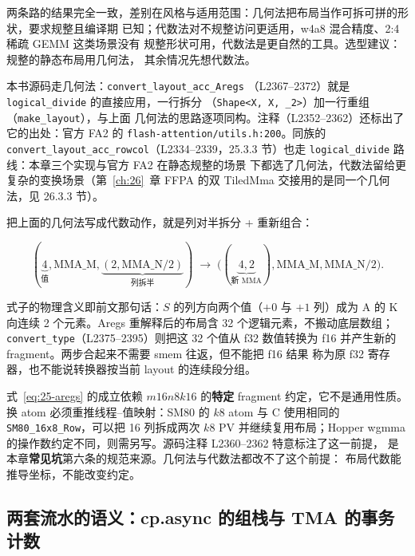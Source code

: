 两条路的结果完全一致，差别在风格与适用范围：几何法把布局当作可拆可拼的形状，要求规整且编译期
已知；代数法对不规整访问更适用，w4a8 混合精度、2:4 稀疏 GEMM 这类场景没有
规整形状可用，代数法是更自然的工具。选型建议：规整的静态布局用几何法，
其余情况先想代数法。

本书源码走几何法：\texttt{convert\_\allowbreak{}layout\_\allowbreak{}acc\_\allowbreak{}Aregs}
（L2367--2372）就是 \texttt{logical\_\allowbreak{}divide} 的直接应用，一行拆分
（\texttt{Shape<X, X, \_2>}）加一行重组（\texttt{make\_layout}），与上面
几何法的思路逐项同构。注释（L2352--2362）还标出了它的出处：官方 FA2 的
\texttt{flash-attention/\allowbreak{}utils.\allowbreak{}h:200}。同族的
\texttt{convert\_\allowbreak{}layout\_\allowbreak{}acc\_\allowbreak{}rowcol}（L2334--2339，25.3.3 节）也走
\texttt{logical\_\allowbreak{}divide} 路线：本章三个实现与官方 FA2 在静态规整的场景
下都选了几何法，代数法留给更复杂的变换场景（第~\ref{ch:26}~章 FFPA
的双 TiledMma 交接用的是同一个几何法，见 26.3.3 节）。



把上面的几何法写成代数动作，就是列对半拆分 + 重新组合：

\begin{equation}
  (\underbrace{4}_{\text{值}}, \mathrm{MMA\_M}, \underbrace{(2, \mathrm{MMA\_N}/2)}_{\text{列拆半}})
  \;\longrightarrow\;
  \bigl((\underbrace{4,2}_{\text{新 MMA}}), \mathrm{MMA\_M}, \mathrm{MMA\_N}/2\bigr).
  \label{eq:25-aregs}
\end{equation}

式子的物理含义即前文那句话：$S$ 的列方向两个值（$+0$ 与 $+1$ 列）成为 A 的
K 向连续 2 个元素。Aregs 重解释后的布局含 32 个逻辑元素，不搬动底层数组；
\texttt{convert\_\allowbreak{}type}（L2375--2395）则把这 32 个值从 f32 数值转换为
f16 并产生新的 fragment。两步合起来不需要 smem 往返，但不能把 f16 结果
称为原 f32 寄存器，也不能说转换器按当前 layout 的连续段分组。

\begin{remark}
  式~\eqref{eq:25-aregs} 的成立依赖 $m16n8k16$ 的\textbf{特定} fragment
  约定，它不是通用性质。换 atom 必须重推线程--值映射：SM80 的 $k8$ atom
  与 C 使用相同的 \texttt{SM80\_16x8\_Row}，可以把 16 列拆成两次 $k8$ PV
  并继续复用布局；Hopper wgmma 的操作数约定不同，则需另写。源码注释
  L2360--2362 特意标注了这一前提，
  是本章\textbf{常见坑}第六条的规范来源。几何法与代数法都改不了这个前提：
  布局代数能推导坐标，不能改变约定。
\end{remark}

\subsection{两套流水的语义：cp.async 的组栈与 TMA 的事务计数}

